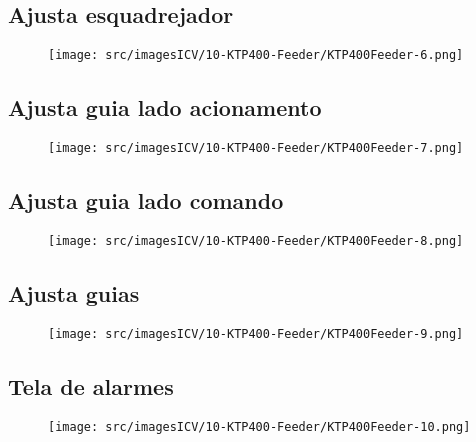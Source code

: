 \newpage
\thispagestyle{fancy}
\vspace{\fill}
\subsection{\small Ajusta esquadrejador}
\begin{figure}
    \centering
    \texttt{[image: src/imagesICV/10-KTP400-Feeder/KTP400Feeder-6.png]}
\end{figure}

\newpage
\thispagestyle{fancy}
\vspace{\fill}
\subsection{\small Ajusta guia lado acionamento}
\begin{figure}
    \centering
    \texttt{[image: src/imagesICV/10-KTP400-Feeder/KTP400Feeder-7.png]}
\end{figure}

\newpage
\thispagestyle{fancy}
\vspace{\fill}
\subsection{\small Ajusta guia lado comando}
\begin{figure}
    \centering
    \texttt{[image: src/imagesICV/10-KTP400-Feeder/KTP400Feeder-8.png]}
\end{figure}

\newpage
\thispagestyle{fancy}
\vspace{\fill}
\subsection{\small Ajusta guias}
\begin{figure}
    \centering
    \texttt{[image: src/imagesICV/10-KTP400-Feeder/KTP400Feeder-9.png]}
\end{figure}

\newpage
\thispagestyle{fancy}
\vspace{\fill}
\subsection{\small Tela de alarmes}
\begin{figure}
    \centering
    \texttt{[image: src/imagesICV/10-KTP400-Feeder/KTP400Feeder-10.png]}
\end{figure}
